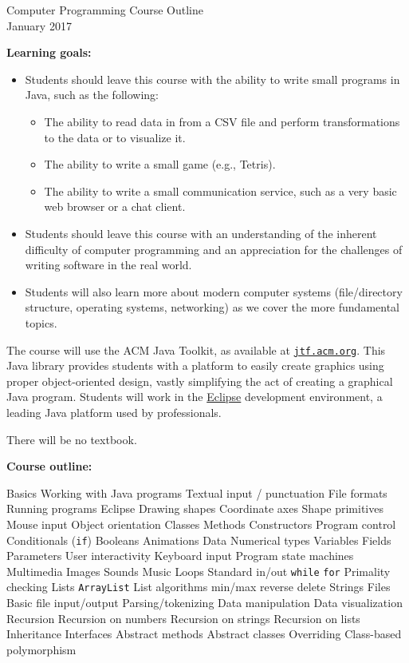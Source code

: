 \documentclass[12pt]{article}
\begin{document}
\begin{center}
\Large
Computer Programming Course Outline\\
January 2017
\end{center}

\textbf{Learning goals:} 
\begin{itemize}
\item Students should leave this course with the
ability to write small programs in Java, such as the following:
\begin{itemize}
\item The ability to read data in from a CSV file and perform transformations
to the data or to visualize it.
\item The ability to write a small game (e.g., Tetris).
\item The ability to write a small communication service, such as a very
basic web browser or a chat client.
\end{itemize}
\item Students should leave this course with an understanding of the
inherent difficulty of computer programming and an appreciation for the
challenges of writing software in the real world.
\item Students will also learn more about modern computer systems (file/directory
structure, operating systems, networking) as we cover the more fundamental
topics.
\end{itemize}

The course will use the ACM Java Toolkit, as available at
\href{http://jtf.acm.org}{\texttt{jtf.acm.org}}. This Java library provides
students with a platform to easily create graphics using proper object-oriented
design, vastly simplifying the act of creating a graphical Java program. Students
will work in the \href{http://eclipse.org}{Eclipse} development environment,
a leading Java platform used by professionals.

There will be no textbook.

\textbf{Course outline:}
\begin{outline}[enumerate]
\setlength{\itemsep}{0pt}
\setlength{\parskip}{0pt}
\1 Basics
  \2 Working with Java programs
     \3 Textual input / punctuation
     \3 File formats
     \3 Running programs
     \3 Eclipse
  \2 Drawing shapes
     \3 Coordinate axes
     \3 Shape primitives
  \2 Mouse input
\1 Object orientation
  \2 Classes
  \2 Methods
  \2 Constructors
\1 Program control
  \2 Conditionals (\texttt{if})
  \2 Booleans
  \2 Animations
\1 Data
  \2 Numerical types
  \2 Variables
  \2 Fields
  \2 Parameters
\1 User interactivity
  \2 Keyboard input
  \2 Program state machines
  \2 Multimedia
     \3 Images
     \3 Sounds
     \3 Music
\1 Loops
  \2 Standard in/out
  \2 \texttt{while}
  \2 \texttt{for}
  \2 Primality checking
\1 Lists
  \2 \texttt{ArrayList}
  \2 List algorithms
     \3 min/max
     \3 reverse
     \3 delete
  \2 Strings
\1 Files
  \2 Basic file input/output
  \2 Parsing/tokenizing
  \2 Data manipulation
  \2 Data visualization
\1 Recursion
  \2 Recursion on numbers
  \2 Recursion on strings
  \2 Recursion on lists
\1 Inheritance
  \2 Interfaces
  \2 Abstract methods
  \2 Abstract classes
  \2 Overriding
  \2 Class-based polymorphism
\end{outline}
\end{document}
